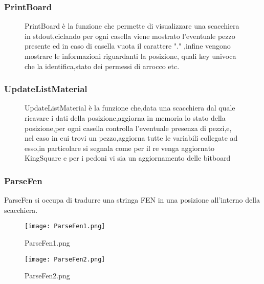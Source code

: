 \subsubsection{PrintBoard}
\begin{figure}[H]
    \begin{minipage}[t]{.63\textwidth}
        \centering {}
    \end{minipage}
    \begin{minipage}[t]{0.35\textwidth}
        \small{PrintBoard è la funzione che permette di visualizzare una scacchiera in stdout,ciclando per ogni casella viene mostrato l'eventuale pezzo presente ed in caso di casella vuota il carattere "." ,infine
            vengono mostrare le informazioni riguardanti la posizione, quali key univoca che la identifica,stato dei permessi di arrocco etc.}
    \end{minipage}
\end{figure}



\subsubsection{UpdateListMaterial}
\begin{figure}[H]
    \begin{minipage}[t]{.63\textwidth}
        \centering {}
    \end{minipage}
    \begin{minipage}[t]{0.35\textwidth}
        \small{UpdateListMaterial è la funzione che,data una scacchiera dal quale ricavare i dati della posizione,aggiorna in memoria lo stato della posizione,per ogni casella controlla l'eventuale presenza di pezzi,e,
            nel caso in cui trovi un pezzo,aggiorna tutte le variabili collegate ad esso,in particolare si segnala come per il re venga aggiornato KingSquare e per i pedoni vi sia un aggiornamento delle bitboard}
    \end{minipage}
\end{figure}

\newpage
\subsubsection{ParseFen}
\FloatBarrier
ParseFen si occupa di tradurre una stringa FEN in una posizione all'interno della scacchiera.
\begin{figure}[H]
    \centering
    \begin{minipage}[b]{0.3\textwidth}
        \texttt{[image: ParseFen1.png]}
        \caption{ParseFen1.png}
    \end{minipage}
    \hfill
    \begin{minipage}[b]{0.4\textwidth}
        \texttt{[image: ParseFen2.png]}
        \caption{ParseFen2.png}
    \end{minipage}
\end{figure}

